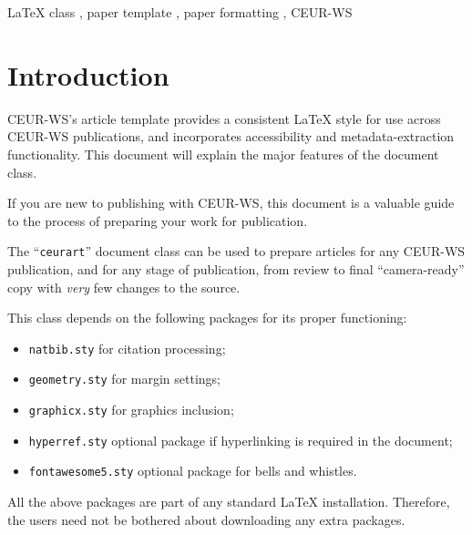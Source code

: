 \documentclass[
]{ceurart}
\begin{document}
\begin{keywords}
  LaTeX class \sep
  paper template \sep
  paper formatting \sep
  CEUR-WS
\end{keywords}

\maketitle

\section{Introduction}

CEUR-WS's article template provides a consistent \LaTeX{} style for
use across CEUR-WS publications, and incorporates accessibility and
metadata-extraction functionality. This document will explain the
major features of the document class.

If you are new to publishing with CEUR-WS, this document is a valuable
guide to the process of preparing your work for publication.

The ``\verb|ceurart|'' document class can be used to prepare articles
for any CEUR-WS publication, and for any stage of publication, from
review to final ``camera-ready'' copy with {\itshape very} few changes
to the source.

This class depends on the following packages
for its proper functioning:

\begin{itemize}
\item \verb|natbib.sty| for citation processing;
\item \verb|geometry.sty| for margin settings;
\item \verb|graphicx.sty| for graphics inclusion;
\item \verb|hyperref.sty| optional package if hyperlinking is required in
  the document;
\item \verb|fontawesome5.sty| optional package for bells and whistles.
\end{itemize}

All the above packages are part of any
standard \LaTeX{} installation.
Therefore, the users need not be
bothered about downloading any extra packages.
\end{document}
